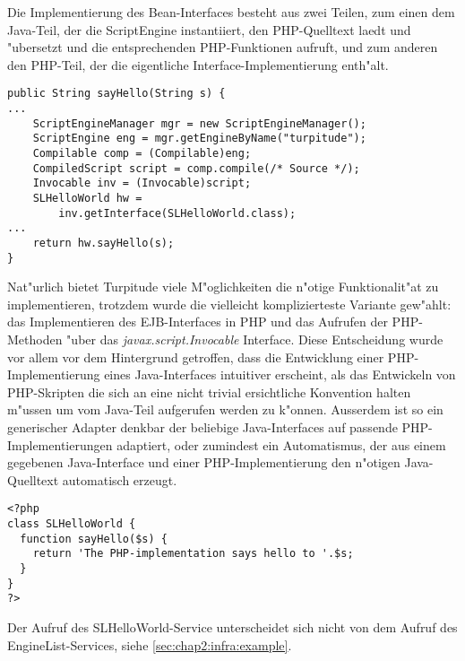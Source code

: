 Die Implementierung des Bean-Interfaces besteht aus zwei Teilen, zum einen dem Java-Teil, der die
ScriptEngine instantiiert, den PHP-Quelltext laedt und "ubersetzt und die entsprechenden PHP-Funktionen
aufruft, und zum anderen den PHP-Teil, der die eigentliche Interface-Implementierung enth"alt.
\begin{lstlisting}[caption=Java-Teil]
public String sayHello(String s) {
...
    ScriptEngineManager mgr = new ScriptEngineManager();
    ScriptEngine eng = mgr.getEngineByName("turpitude");
    Compilable comp = (Compilable)eng;
    CompiledScript script = comp.compile(/* Source */);
    Invocable inv = (Invocable)script;
    SLHelloWorld hw = 
        inv.getInterface(SLHelloWorld.class);
...
    return hw.sayHello(s);
}
\end{lstlisting}
Nat"urlich bietet Turpitude viele M"oglichkeiten die n"otige Funktionalit"at zu implementieren,
trotzdem wurde die vielleicht komplizierteste Variante gew"ahlt: das Implementieren des EJB-Interfaces in
PHP und das Aufrufen der PHP-Methoden "uber das \emph{javax.script.Invocable} Interface. Diese Entscheidung 
wurde vor allem vor dem Hintergrund getroffen, dass die Entwicklung einer PHP-Implementierung eines Java-Interfaces
intuitiver erscheint, als das Entwickeln von PHP-Skripten die sich an eine nicht trivial ersichtliche
Konvention halten m"ussen um vom Java-Teil aufgerufen werden zu k"onnen. Ausserdem ist so ein 
generischer Adapter denkbar der beliebige Java-Interfaces auf passende PHP-Implementierungen adaptiert,
oder zumindest ein Automatismus, der aus einem gegebenen Java-Interface und einer PHP-Implementierung den 
n"otigen Java-Quelltext automatisch erzeugt.
\begin{lstlisting}[caption=PHP-Implementierung]
<?php
class SLHelloWorld {
  function sayHello($s) {
    return 'The PHP-implementation says hello to '.$s;
  }
}
?>
\end{lstlisting}
Der Aufruf des SLHelloWorld-Service unterscheidet sich nicht von dem Aufruf des EngineList-Services, siehe \ref{sec:chap2:infra:example}.

